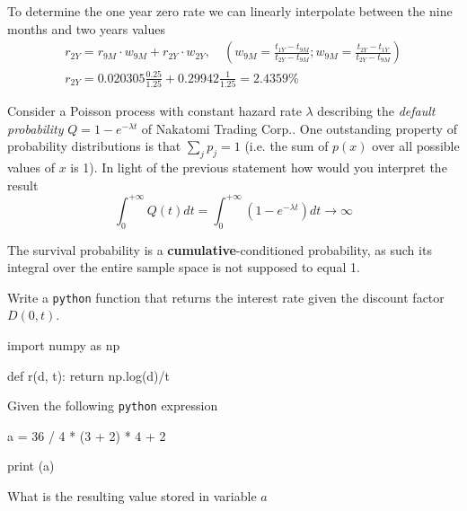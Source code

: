 \documentclass[12pt,a4paper]{exam}
\begin{document}
\begin{questions}
\begin{solution}
To determine the one year zero rate we can linearly interpolate between the nine months and two years values
\begin{equation*}
  \begin{gathered}
    r_{2Y} = r_{9M}\cdot w_{9M} + r_{2Y}\cdot w_{2Y},\quad\left(w_{9M}=\frac{t_{1Y}-t_{9M}}{t_{2Y}-t_{9M}};w_{9M}=\frac{t_{2Y}-t_{1Y}}{t_{2Y}-t_{9M}}\right) \\
    r_{2Y} = 0.020305\frac{0.25}{1.25} + 0.29942 \frac{1}{1.25} = 2.4359\%
  \end{gathered}
\end{equation*}
\end{solution}
\question
Consider a Poisson process with constant hazard rate $\lambda$ describing the \emph{default probability} $Q=1-e^{-\lambda t}$ of Nakatomi Trading Corp.. One outstanding property of probability distributions is that $\sum_j p_j = 1$ (i.e. the sum of $p(x)$ over all possible values of $x$ is 1). In light of the previous statement how would you interpret the result
\begin{equation*}
\int_0^{+\infty} Q(t) dt = \int_0^{+\infty}\left(1- e^{-\lambda t}\right) dt \rightarrow \infty
\end{equation*}
\fillwithlines{3cm}
\begin{solution}
The survival probability is a \textbf{cumulative}-conditioned probability, as such its integral over the entire sample space is not supposed to equal 1. 
\end{solution}

\question
Write a \texttt{python} function that returns the interest rate given the discount factor $D(0, t)$.
\fillwithlines{3cm}
\begin{solution}
  \begin{ipython}
import numpy as np

def r(d, t):
    return np.log(d)/t
  \end{ipython}
\end{solution}
\question
Given the following \texttt{python} expression

\begin{ipython}
a = 36 / 4 * (3 + 2) * 4 + 2

print (a)
\end{ipython}

What is the resulting value stored in variable $a$


\end{questions}
\end{document}
